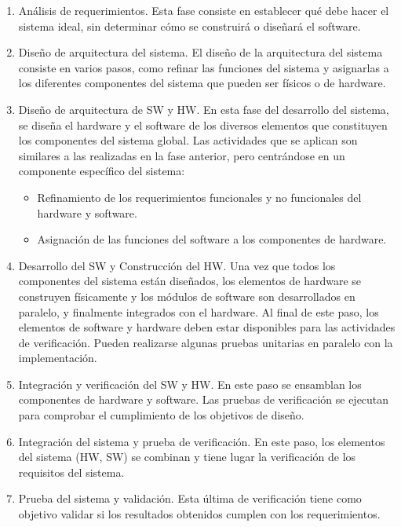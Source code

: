 \begin{enumerate}
	\item Análisis de requerimientos. Esta fase consiste en establecer qué debe hacer el sistema ideal, sin determinar cómo se construirá o diseñará el software. 
	\item Diseño de arquitectura del sistema. El diseño de la arquitectura del sistema consiste en varios pasos, como refinar las funciones del sistema y asignarlas a los diferentes componentes del sistema que pueden ser físicos o de hardware.
	\item Diseño de arquitectura de SW y HW. En esta fase del desarrollo del sistema, se diseña el hardware y el software de los diversos elementos que constituyen los componentes del sistema global. Las actividades que se aplican son similares a las realizadas en la fase anterior, pero centrándose en un componente específico del sistema: 
	\begin{itemize}
		\item Refinamiento de los requerimientos funcionales y no funcionales del hardware y software.
		\item Asignación de las funciones del software a los componentes de hardware.
	\end{itemize}
	\item Desarrollo del SW y Construcción del HW. Una vez que todos los componentes del sistema están diseñados, los elementos de hardware se construyen físicamente y los módulos de software son desarrollados en paralelo, y finalmente integrados con el hardware. Al final de este paso, los elementos de software y hardware deben estar disponibles para las actividades de verificación. Pueden realizarse algunas pruebas unitarias en paralelo con la implementación.
	\item Integración y verificación del SW y HW. En este paso se ensamblan los componentes de hardware y software. Las pruebas de verificación se ejecutan para comprobar el cumplimiento de los objetivos de diseño.
	\item Integración del sistema y prueba de verificación. En este paso, los elementos del sistema (HW, SW) se combinan y tiene lugar la verificación de los requisitos del sistema. 
	\item Prueba del sistema y validación. Esta última de verificación tiene como objetivo validar si los resultados obtenidos cumplen con los requerimientos.
\end{enumerate}